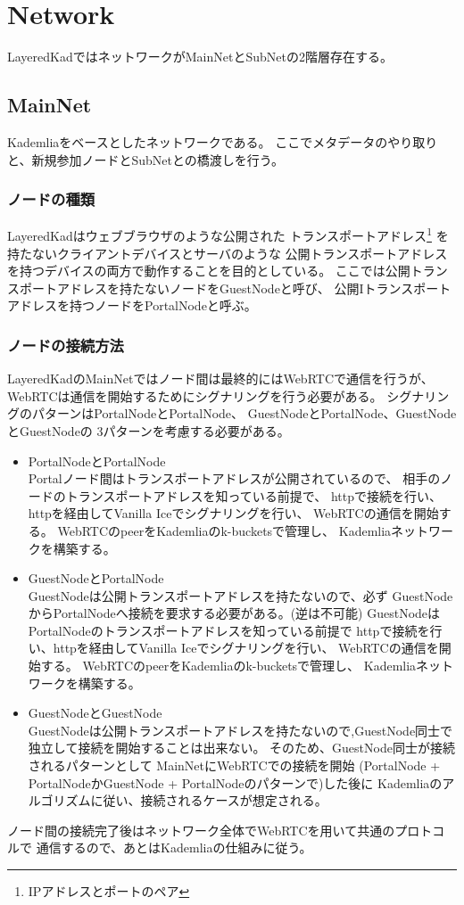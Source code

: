 \documentclass[sotsuron]{jcsie}
\begin{document}
\section{Network}
LayeredKadではネットワークがMainNetとSubNetの2階層存在する。

\subsection{MainNet}
Kademliaをベースとしたネットワークである。
ここでメタデータのやり取りと、新規参加ノードとSubNetとの橋渡しを行う。

\subsubsection{ノードの種類}
LayeredKadはウェブブラウザのような公開された
トランスポートアドレス\footnote{IPアドレスとポートのペア}
を持たないクライアントデバイスとサーバのような
公開トランスポートアドレスを持つデバイスの両方で動作することを目的としている。
ここでは公開トランスポートアドレスを持たないノードをGuestNodeと呼び、
公開Iトランスポートアドレスを持つノードをPortalNodeと呼ぶ。

\subsubsection{ノードの接続方法}
LayeredKadのMainNetではノード間は最終的にはWebRTCで通信を行うが、
WebRTCは通信を開始するためにシグナリングを行う必要がある。
シグナリングのパターンはPortalNodeとPortalNode、
GuestNodeとPortalNode、GuestNodeとGuestNodeの
3パターンを考慮する必要がある。

\begin{itemize}
	\item {PortalNodeとPortalNode}\\
	Portalノード間はトランスポートアドレスが公開されているので、
	相手のノードのトランスポートアドレスを知っている前提で、
	http\cite{fielding1999hypertext}で接続を行い、
	httpを経由してVanilla Iceでシグナリングを行い、
	WebRTCの通信を開始する。
	WebRTCのpeerをKademliaのk-bucketsで管理し、
	Kademliaネットワークを構築する。
	\\
	\item {GuestNodeとPortalNode}\\
	GuestNodeは公開トランスポートアドレスを持たないので、必ず
	GuestNodeからPortalNodeへ接続を要求する必要がある。(逆は不可能)
	GuestNodeはPortalNodeのトランスポートアドレスを知っている前提で
	httpで接続を行い、httpを経由してVanilla Iceでシグナリングを行い、
	WebRTCの通信を開始する。
	WebRTCのpeerをKademliaのk-bucketsで管理し、
	Kademliaネットワークを構築する。
	\\
	\item {GuestNodeとGuestNode}\\
	GuestNodeは公開トランスポートアドレスを持たないので,GuestNode同士で
	独立して接続を開始することは出来ない。
	そのため、GuestNode同士が接続されるパターンとして
	MainNetにWebRTCでの接続を開始
	(PortalNode + PortalNodeかGuestNode + PortalNodeのパターンで)した後に
	Kademliaのアルゴリズムに従い、接続されるケースが想定される。
\end{itemize}
ノード間の接続完了後はネットワーク全体でWebRTCを用いて共通のプロトコルで
通信するので、あとはKademliaの仕組みに従う。
\end{document}
